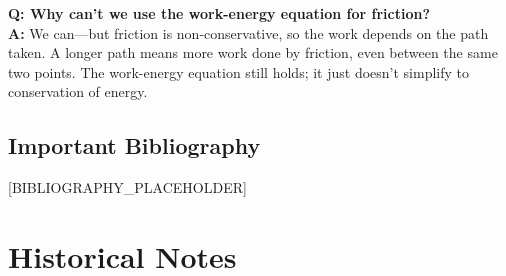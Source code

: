 \documentclass[11pt,openright]{book}
\begin{document}
\textbf{Q: Why can't we use the work-energy equation for friction?}\\
\textbf{A:} We can---but friction is non-conservative, so the work depends on the path taken. A longer path means more work done by friction, even between the same two points. The work-energy equation still holds; it just doesn't simplify to conservation of energy.
\section*{Important Bibliography}

[BIBLIOGRAPHY_PLACEHOLDER]


\chapter{Historical Notes}
\end{document}
